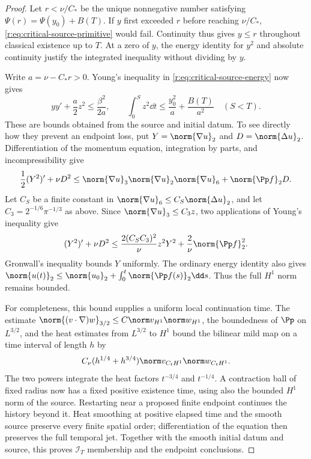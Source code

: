 \begin{proof}
Let \(r<\nu/C_*\) be the unique nonnegative number satisfying
\(\Psi(r)=\Psi(y_0)+B(T)\). If \(y\) first exceeded \(r\) before
reaching \(\nu/C_*\), \eqref{r:eq:critical-source-primitive} would fail.
Continuity thus gives \(y\le r\) throughout classical existence up
to \(T\). At a zero of \(y\), the energy identity for \(y^2\) and
absolute continuity justify the integrated inequality without dividing
by \(y\).

Write \(a=\nu-C_*r>0\). Young's inequality in
\eqref{r:eq:critical-source-energy} now gives
\[
 y y'+\frac a2 z^2\le\frac{\beta^2}{2a},\qquad
 \int_0^S z^2\dd t\le\frac{y_0^2}{a}+\frac{B(T)}{a^2}
 \quad(S<T).
\]
These are bounds obtained from the source and initial datum.
To see directly how they prevent an endpoint loss, put
\(Y=\norm{\nabla u}_2\) and \(D=\norm{\Delta u}_2\).
Differentiation of the momentum equation, integration by parts, and
incompressibility give
\[
 \frac12(Y^2)'+\nu D^2
 \le\norm{\nabla u}_3\norm{\nabla u}_2
       \norm{\nabla u}_6+\norm{\Pp f}_2D.
\]
Let \(C_S\) be a finite constant in
\(\norm{\nabla u}_6\le C_S\norm{\Delta u}_2\), and let
\(C_3=2^{-1/6}\pi^{-1/3}\) as above. Since
\(\norm{\nabla u}_3\le C_3z\), two applications of Young's inequality
give
\[
 (Y^2)'+\nu D^2
 \le\frac{2(C_SC_3)^2}{\nu}z^2Y^2
       +\frac2\nu\norm{\Pp f}_2^2.
\]
Gronwall's inequality bounds \(Y\) uniformly. The ordinary energy
identity also gives
\(\norm{u(t)}_2\le\norm{u_0}_2+
\int_0^t\norm{\Pp f(s)}_2\dd s\).
Thus the full \(H^1\) norm remains bounded.

For completeness, this bound supplies a uniform local continuation time.
The estimate
\(\norm{(v\cdot\nabla)w}_{3/2}
\le C\norm v_{H^1}\norm w_{H^1}\), the boundedness of \(\Pp\)
on \(L^{3/2}\), and the heat estimates from \(L^{3/2}\) to \(H^1\)
bound the bilinear mild map on a time interval of length \(h\) by
\[
 C_\nu(h^{1/4}+h^{3/4})
 \norm v_{C_tH^1}\norm w_{C_tH^1}.
\]
The two powers integrate the heat factors \(t^{-3/4}\) and
\(t^{-1/4}\). A contraction ball of fixed radius now has a fixed
positive existence time, using also the bounded \(H^1\) norm of the
source. Restarting near a proposed finite endpoint continues the
history beyond it. Heat smoothing at positive elapsed time and the
smooth source preserve every finite spatial order; differentiation
of the equation then preserves the full temporal jet. Together with
the smooth initial datum and source, this proves \(\mathscr I_T\)
membership and the endpoint conclusions.
\end{proof}


